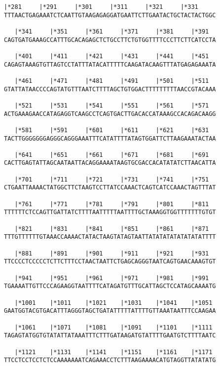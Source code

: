 \documentclass{article}
\begin{document}
\begin{Verbatim}[fontfamily=courier]
   |*281     |*291     |*301     |*311     |*321     |*331  
TTTAACTGAGAAATCTCAATTGTAAGAGAGGATGAATTCTTGAATACTGCTACTACTGGC

   |*341     |*351     |*361     |*371     |*381     |*391  
CAGTGATGAAAGCCATTTGCACAGAGCTCTGCCTTCTGTGGTTTTCCCTTCTTCATCCTA

   |*401     |*411     |*421     |*431     |*441     |*451  
CAGAGTAAAGTGTTAGTCCTATTTATACATTTTTCAAGATACAAGTTTATGAGAGAAATA

   |*461     |*471     |*481     |*491     |*501     |*511  
GTATTATAACCCCAGTATGTTTAATCTTTTAGCTGTGGACTTTTTTTTTAACCGTACAAA

   |*521     |*531     |*541     |*551     |*561     |*571  
ACTGAAAGAACCATAGAGGTCAAGCCTCAGTGACTTGACACCATAAAGCCACAGACAAGG

   |*581     |*591     |*601     |*611     |*621     |*631  
TACTTGGGGGGGAGGGCAGGGAAATTTCATATTTTATAGTGGATTCTTAAGAAATACTAA

   |*641     |*651     |*661     |*671     |*681     |*691  
CACTTGAGTATTAGCAATAATTACAGGAAAATAAGTGCGACCACATATATCTTAACATTA

   |*701     |*711     |*721     |*731     |*741     |*751  
CTGAATTAAAACTATGGCTTCTAAGTCCTTATCCAAACTCAGTCATCCAAACTAGTTTAT

   |*761     |*771     |*781     |*791     |*801     |*811  
TTTTTTCTCCAGTTGATTATCTTTTAATTTTTAATTTTGCTAAAGGTGGTTTTTTTGTGT

   |*821     |*831     |*841     |*851     |*861     |*871  
TTTGTTTTTTGTAAACCAAAACTATACTAAGTATAGTAATTATATATATATATATATTTT

   |*881     |*891     |*901     |*911     |*921     |*931  
TTCCCCTCCCCCTCTTCTTTCCTAACTAATTCTGAGCAGGGTAATCAGTGAACAAAGTGT

   |*941     |*951     |*961     |*971     |*981     |*991  
TGAAAATTGTTCCCAGAAGGTAATTTTCATAGATGTTTGCATTAGCTCCATAGCAAAATG

   |*1001    |*1011    |*1021    |*1031    |*1041    |*1051 
GAATGGTACGTGACATTTAGGGTAGCTGATATTTTTATTTTGTTAAATAATTTCCAAGAA

   |*1061    |*1071    |*1081    |*1091    |*1101    |*1111 
TAGAGTATGGTGTATATTATAAATTTCTTTGATAAGATGTATTTTGAATGTCTTTTAATC

   |*1121    |*1131    |*1141    |*1151    |*1161    |*1171 
TTCCTCCTCCTCTCCAAAAAAATCAGAAACCTCTTTAAGAAAACATGTAGGTTATATATG

\end{Verbatim}
\newpage
\end{document}
